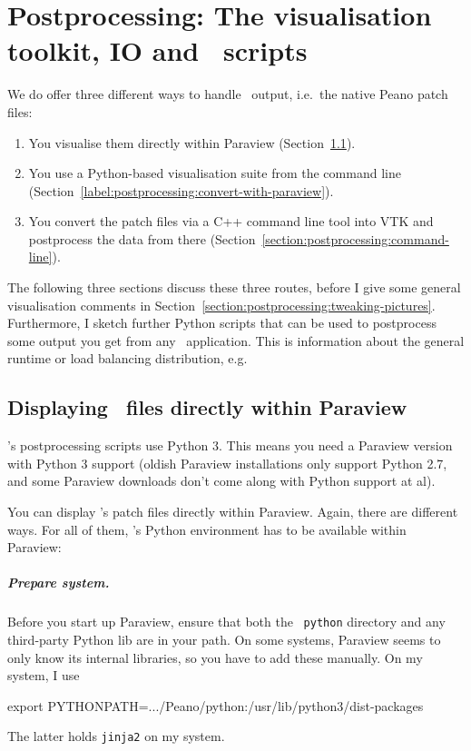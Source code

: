 \chapter{Postprocessing: The visualisation toolkit, IO and \Peano\
scripts}
\label{chapter:postprocessing}



We do offer three different ways to handle \Peano\ output, i.e.~the native Peano
patch files:

\begin{enumerate}
  \item You visualise them directly within Paraview (Section~\ref{label:postprocessing:display-in-paraview}).
  \item You use a Python-based visualisation suite from the command line
  (Section~\ref{label:postprocessing:convert-with-paraview}).
  \item You convert the patch files via a C++ command line tool into VTK and
  postprocess the data from there
  (Section~\ref{section:postprocessing:command-line}).
\end{enumerate}


\noindent
The following three sections discuss these three routes, before I give some
general visualisation comments in
Section~\ref{section:postprocessing:tweaking-pictures}. 
Furthermore, I sketch further Python scripts that can be used to postprocess
some output you get from any \Peano\ application.
This is information about the general runtime or load balancing distribution,
e.g.


\section{Displaying \Peano\ files directly within Paraview}
\label{label:postprocessing:display-in-paraview}

\begin{remark}
  \Peano's postprocessing scripts use Python 3. This means you need a Paraview
  version with Python 3 support (oldish Paraview installations only support
  Python 2.7, and some Paraview downloads don't come along with Python support
  at al).
\end{remark}


\noindent
You can display \Peano's patch files directly within Paraview. 
Again, there are different ways.
For all of them, \Peano's Python environment has to be available within Paraview:



\paragraph{Prepare system.}
%
%
Before you start up Paraview, ensure that both the \Peano\ \texttt{python}
directory and any third-party Python lib are in your path. 
On some systems, Paraview seems to
only know its internal libraries, so you have to add these manually. On my
system, I use
  \begin{code}
export PYTHONPATH=.../Peano/python:/usr/lib/python3/dist-packages  
  \end{code}
The latter holds \texttt{jinja2} on my system.


